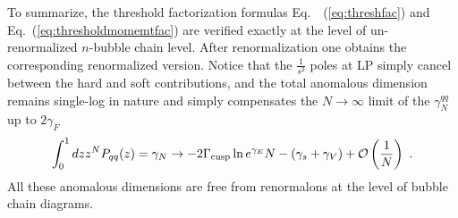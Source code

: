 \documentclass[a4paper,11pt]{article}
\begin{document}
To summarize, the threshold factorization formulas Eq.~~(\ref{eq:threshfac}) and Eq.~(\ref{eq:thresholdmomemtfac}) are verified exactly at the level of un-renormalized $n$-bubble chain level. After renormalization one obtains the corresponding renormalized version. Notice that the $\frac{1}{s^2}$ poles at LP simply cancel between the hard and soft contributions, and the total anomalous dimension remains single-log in nature and simply compensates the $N\rightarrow \infty$ limit of the $\gamma^{qq}_N$ up to $2\gamma_F$
\begin{align}
\int_{0}^1 dz z^N P_{qq}(z)=\gamma_N \rightarrow -2\Gamma_{\rm cusp} \ln e^{\gamma_E}N-(\gamma_s+\gamma_V)+{\cal O}\left(\frac{1}{N}\right) \ .
\end{align}
All these anomalous dimensions are free from renormalons at the level of bubble chain diagrams. 
\end{document}

